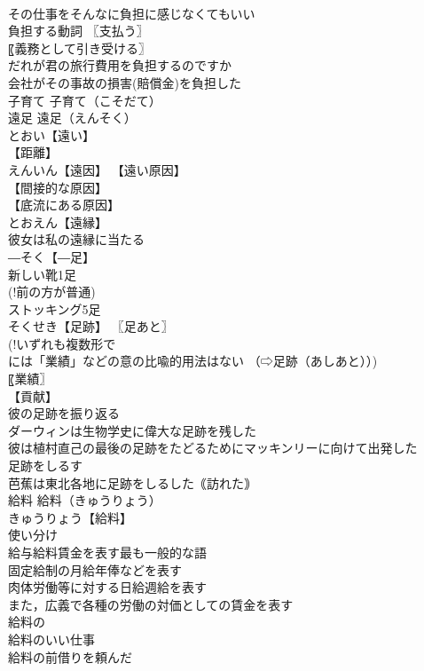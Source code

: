 \documentclass[8pt]{extreport}
\begin{document}
\begin{CJK}{UTF8}{min}
\\	その仕事をそんなに負担に感じなくてもいい 
\\	負担する動詞 〖支払う〗
\\	〖義務として引き受ける〗
\\	だれが君の旅行費用を負担するのですか 
\\	会社がその事故の損害(賠償金)を負担した 
\\	子育て		子育て（こそだて） 
\\	遠足		遠足（えんそく） 
\\	とおい【遠い】 
\\	【距離】 
\\	えんいん【遠因】 【遠い原因】
\\	【間接的な原因】
\\	【底流にある原因】
\\	とおえん【遠縁】 
\\	彼女は私の遠縁に当たる 
\\	―そく【―足】 
\\	新しい靴1足 
\\	(!前の方が普通) 
\\	ストッキング5足 
\\	そくせき【足跡】 〖足あと〗
\\	(!いずれも複数形で
\\	には「業績」などの意の比喩的用法はない （⇨足跡（あしあと））) 
\\	〖業績〗
\\	【貢献】
\\	彼の足跡を振り返る 
\\	ダーウィンは生物学史に偉大な足跡を残した 
\\	彼は植村直己の最後の足跡をたどるためにマッキンリーに向けて出発した 
\\	足跡をしるす 
\\	芭蕉は東北各地に足跡をしるした｟訪れた｠ 
\\	給料		給料（きゅうりょう） 
\\	きゅうりょう【給料】 
\\	使い分け
\\	給与給料賃金を表す最も一般的な語
\\	固定給制の月給年俸などを表す
\\	肉体労働等に対する日給週給を表す
\\	また，広義で各種の労働の対価としての賃金を表す
\\	給料の 
\\	給料のいい仕事 
\\	給料の前借りを頼んだ 

\end{CJK}
\end{document}
